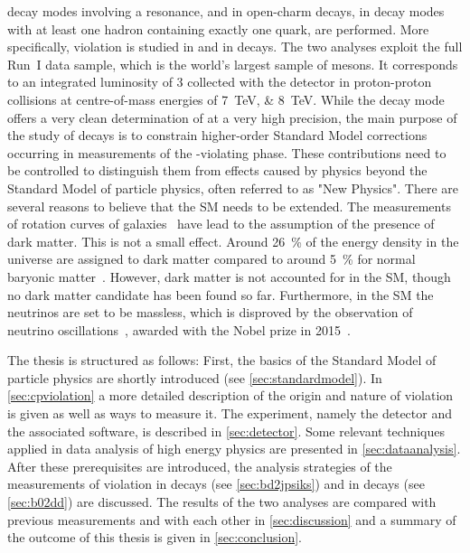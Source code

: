 decay modes involving a \ccbar resonance, and in open-charm decays, \ie in
decay modes with at least one hadron containing exactly one \cquark quark, are
performed. More specifically, \CP violation is studied in \BdToJPsiKS and in
\BdToDD decays. The two analyses exploit the full Run~I data sample, which is
the world's largest sample of \Bz mesons. It corresponds to an integrated
luminosity of \SI{3}{\invfb} collected with the \lhcb detector in
proton-proton collisions at centre-of-mass energies of \SIlist{7;8}{\TeV}.
While the decay mode \BdToJPsiKS offers a very clean determination of
\sintwobeta at a very high precision, the main purpose of the study of \BdToDD
decays is to constrain higher-order Standard Model corrections occurring in
measurements of the \CP-violating phase. These contributions need to be
controlled to distinguish them from effects caused by physics beyond the
Standard Model of particle physics, often referred to as "New Physics". There
are several reasons to believe that the SM needs to be extended. The
measurements of rotation curves of galaxies~\cite{AndromedaNebula} have lead
to the assumption of the presence of dark matter. This is not a small effect.
Around \SI{26}{\percent} of the energy density in the universe are assigned to
dark matter compared to around \SI{5}{\percent} for normal baryonic
matter~\cite{Ade:2015xua}. However, dark matter is not accounted for in the
SM, though no dark matter candidate has been found so far. Furthermore, in the
SM the neutrinos are set to be massless, which is disproved by the observation
of neutrino oscillations~\cite{Fukuda:1998mi,Ahmad:2001an,*Ahmad:2002jz},
awarded with the Nobel prize in 2015~\cite{NobelPrize2015}.

The thesis is structured as follows: First, the basics of the
Standard Model of particle physics are shortly introduced (see
\cref{sec:standardmodel}). In \cref{sec:cpviolation} a more detailed
description of the origin and nature of \CP violation is given as well as ways
to measure it. The \lhcb experiment, namely the detector and the associated
software, is described in \cref{sec:detector}. Some relevant techniques
applied in data analysis of high energy physics are presented in
\cref{sec:dataanalysis}. After these prerequisites are introduced, the analysis
strategies of the measurements of \CP violation in \BdToJPsiKS decays (see
\cref{sec:bd2jpsiks}) and in \BdToDD decays (see \cref{sec:b02dd}) are
discussed. The results of the two analyses are compared with previous
measurements and with each other in \cref{sec:discussion} and a summary of the
outcome of this thesis is given in \cref{sec:conclusion}.
